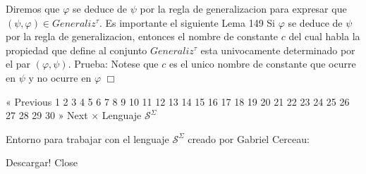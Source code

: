 Diremos que \(\varphi \) se deduce de \(\psi \) por la regla de generalizacion para expresar que \((\psi ,\varphi )\in Generaliz^{\tau }\). Es importante el siguiente
Lema 149 Si \(\varphi \) se deduce de \(\psi \) por la regla de generalizacion, entonces el nombre de constante \(c\) del cual habla la propiedad que define al conjunto \(Generaliz^{\tau }\) esta univocamente determinado por el par \( (\varphi ,\psi )\).
Prueba: Notese que \(c\) es el unico nombre de constante que ocurre en \(\psi \) y no ocurre en \(\varphi \) \(\Box\)

« Previous
1
2
3
4
5
6
7
8
9
10
11
12
13
14
15
16
17
18
19
20
21
22
23
24
25
26
27
28
29
30
» Next
×
Lenguaje \(\mathcal{S}^{\Sigma }\)

Entorno para trabajar con el lenguaje \(\mathcal{S}^{\Sigma }\) creado por Gabriel Cerceau:

Descargar!
Close
